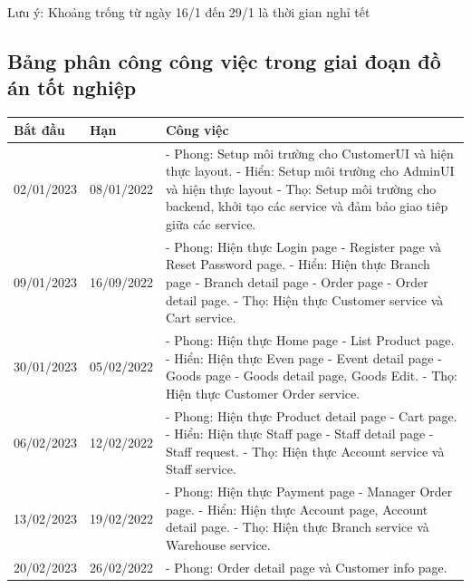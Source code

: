 Lưu ý: Khoảng trống từ ngày 16/1 đến 29/1 là thời gian nghỉ tết

\newpage
\subsection{Bảng phân công công việc trong giai đoạn đồ án tốt nghiệp}
\begin{longtable}{| p{2cm} | p{2cm} | p{10cm} |}

	\hline
	\textbf{Bắt đầu} & \textbf{Hạn} & \textbf{Công việc} \\
	\hline
	02/01/2023 & 08/01/2022 & 
    - Phong: Setup môi trường cho CustomerUI và hiện thực layout. 
    \newline
    - Hiển: Setup môi trường cho AdminUI và hiện thực layout 
    \newline
    - Thọ: Setup môi trường cho backend, khởi tạo các service và đảm bảo giao tiêp giữa các service. \\
	\hline
	09/01/2023 & 16/09/2022 & 
    - Phong: Hiện thực Login page - Register page và Reset Password page. 
    \newline
    - Hiển: Hiện thực Branch page - Branch detail page - Order page - Order detail page. 
    \newline
    - Thọ: Hiện thực Customer service và Cart service. \\
	\hline
	30/01/2023 & 05/02/2022 & 
    - Phong: Hiện thực Home page - List Product page. 
    \newline
    - Hiển: Hiện thực Even page - Event detail page - Goods page - Goods detail page, Goods Edit. 
    \newline
    - Thọ: Hiện thực Customer Order service. \\
	\hline
	06/02/2023 & 12/02/2022 & 
    - Phong: Hiện thực Product detail page - Cart page. 
    \newline
    - Hiển: Hiện thực Staff page - Staff detail page - Staff request. 
    \newline
    - Thọ: Hiện thực Account service và Staff service. \\
	\hline
	13/02/2023 & 19/02/2022 & 
    - Phong: Hiện thực Payment page - Manager Order page. 
    \newline
    - Hiển: Hiện thực Account page, Account detail page. 
    \newline
    - Thọ: Hiện thực Branch service và Warehouse service. \\
	\hline
	20/02/2023 & 26/02/2022 & 
    - Phong: Order detail page và Customer info page. 

\end{longtable}
